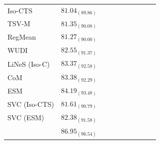 \begin{table}[!htbp]
{\begin{tabular}{@{}lccc|ccc|ccc@{}}
    Iso-CTS & $81.04_{(89.86)}$ & \placeholdervalue{--} & \placeholdervalue{--} & \placeholdervalue{--} & \placeholdervalue{--} & \placeholdervalue{--} & \placeholdervalue{--} & \placeholdervalue{--} & \placeholdervalue{--} \\
    TSV-M & $81.35_{(90.08)}$ & \placeholdervalue{--} & \placeholdervalue{--} & \placeholdervalue{--} & \placeholdervalue{--} & \placeholdervalue{--} & \placeholdervalue{--} & \placeholdervalue{--} & \placeholdervalue{--} \\
    RegMean & $81.27_{(90.00)}$ & \placeholdervalue{--} & \placeholdervalue{--} & \placeholdervalue{--} & \placeholdervalue{--} & \placeholdervalue{--} & \placeholdervalue{--} & \placeholdervalue{--} & \placeholdervalue{--} \\
    WUDI & $82.55_{(91.37)}$ & \placeholdervalue{--} & \placeholdervalue{--} & \placeholdervalue{--} & \placeholdervalue{--} & \placeholdervalue{--} & \placeholdervalue{--} & \placeholdervalue{--} & \placeholdervalue{--} \\
    LiNeS (Iso-C) & $83.37_{(92.58)}$ & \placeholdervalue{--} & \placeholdervalue{--} & \placeholdervalue{--} & \placeholdervalue{--} & \placeholdervalue{--} & \placeholdervalue{--} & \placeholdervalue{--} & \placeholdervalue{--} \\
    CoM & $83.38_{(92.29)}$ & \placeholdervalue{--} & \placeholdervalue{--} & \placeholdervalue{--} & \placeholdervalue{--} & \placeholdervalue{--} & \placeholdervalue{--} & \placeholdervalue{--} & \placeholdervalue{--} \\
    ESM & $84.19_{(93.48)}$ & \placeholdervalue{--} & \placeholdervalue{--} & \placeholdervalue{--} & \placeholdervalue{--} & \placeholdervalue{--} & \placeholdervalue{--} & \placeholdervalue{--} & \placeholdervalue{--} \\
    SVC (Iso-CTS) & $81.61_{(90.79)}$ & \placeholdervalue{--} & \placeholdervalue{--} & \placeholdervalue{--} & \placeholdervalue{--} & \placeholdervalue{--} & \placeholdervalue{--} & \placeholdervalue{--} & \placeholdervalue{--} \\
    SVC (ESM) & $82.38_{(91.58)}$ & \placeholdervalue{--} & \placeholdervalue{--} & \placeholdervalue{--} & \placeholdervalue{--} & \placeholdervalue{--} & \placeholdervalue{--} & \placeholdervalue{--} & \placeholdervalue{--} \\
    \rowcolor{black!8}
    \textbf{\method{}} & $\boldsymbol{86.95_{(96.54)}}$ & \placeholdervalue{--} & \placeholdervalue{--} & \placeholdervalue{--} & \placeholdervalue{--} & \placeholdervalue{--} & \placeholdervalue{--} & \placeholdervalue{--} & \placeholdervalue{--} \\
    \bottomrule
  \end{tabular}%
  }
\end{table}

